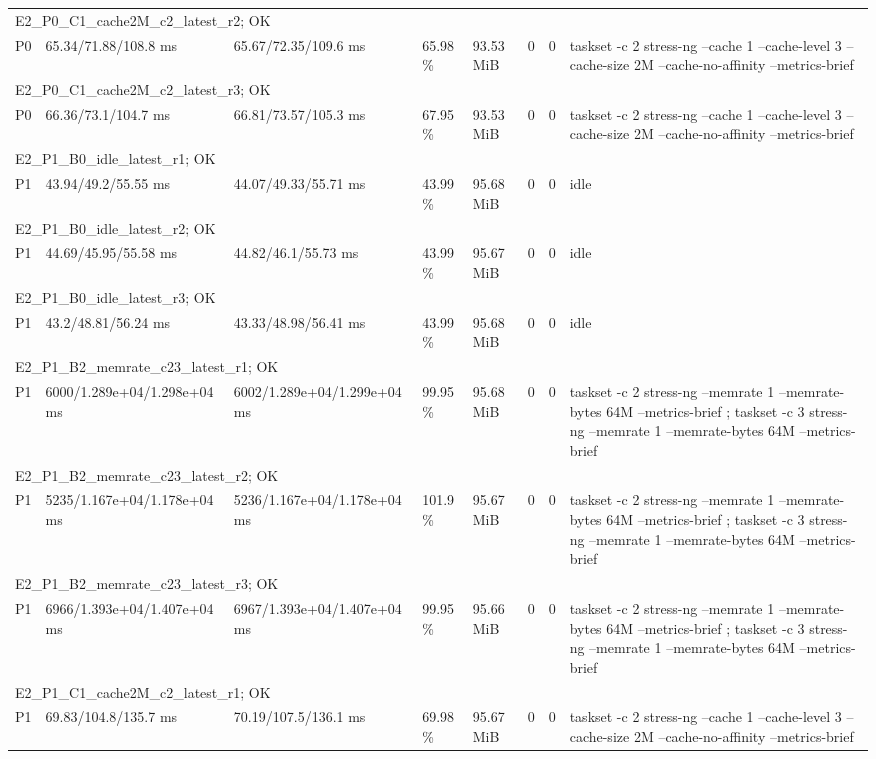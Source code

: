 \begin{tabular}{llllllll}
\multicolumn{8}{l}{E2\_P0\_C1\_cache2M\_c2\_latest\_r2; OK} \\
P0 & 65.34/71.88/108.8 ms & 65.67/72.35/109.6 ms & 65.98 \% & 93.53 MiB & 0 & 0 & taskset -c 2 stress-ng --cache 1 --cache-level 3 --cache-size 2M --cache-no-affinity --metrics-brief \\
\multicolumn{8}{l}{E2\_P0\_C1\_cache2M\_c2\_latest\_r3; OK} \\
P0 & 66.36/73.1/104.7 ms & 66.81/73.57/105.3 ms & 67.95 \% & 93.53 MiB & 0 & 0 & taskset -c 2 stress-ng --cache 1 --cache-level 3 --cache-size 2M --cache-no-affinity --metrics-brief \\
\multicolumn{8}{l}{E2\_P1\_B0\_idle\_latest\_r1; OK} \\
P1 & 43.94/49.2/55.55 ms & 44.07/49.33/55.71 ms & 43.99 \% & 95.68 MiB & 0 & 0 & idle \\
\multicolumn{8}{l}{E2\_P1\_B0\_idle\_latest\_r2; OK} \\
P1 & 44.69/45.95/55.58 ms & 44.82/46.1/55.73 ms & 43.99 \% & 95.67 MiB & 0 & 0 & idle \\
\multicolumn{8}{l}{E2\_P1\_B0\_idle\_latest\_r3; OK} \\
P1 & 43.2/48.81/56.24 ms & 43.33/48.98/56.41 ms & 43.99 \% & 95.68 MiB & 0 & 0 & idle \\
\multicolumn{8}{l}{E2\_P1\_B2\_memrate\_c23\_latest\_r1; OK} \\
P1 & 6000/1.289e+04/1.298e+04 ms & 6002/1.289e+04/1.299e+04 ms & 99.95 \% & 95.68 MiB & 0 & 0 & taskset -c 2 stress-ng --memrate 1 --memrate-bytes 64M --metrics-brief ; taskset -c 3 stress-ng --memrate 1 --memrate-bytes 64M --metrics-brief \\
\multicolumn{8}{l}{E2\_P1\_B2\_memrate\_c23\_latest\_r2; OK} \\
P1 & 5235/1.167e+04/1.178e+04 ms & 5236/1.167e+04/1.178e+04 ms & 101.9 \% & 95.67 MiB & 0 & 0 & taskset -c 2 stress-ng --memrate 1 --memrate-bytes 64M --metrics-brief ; taskset -c 3 stress-ng --memrate 1 --memrate-bytes 64M --metrics-brief \\
\multicolumn{8}{l}{E2\_P1\_B2\_memrate\_c23\_latest\_r3; OK} \\
P1 & 6966/1.393e+04/1.407e+04 ms & 6967/1.393e+04/1.407e+04 ms & 99.95 \% & 95.66 MiB & 0 & 0 & taskset -c 2 stress-ng --memrate 1 --memrate-bytes 64M --metrics-brief ; taskset -c 3 stress-ng --memrate 1 --memrate-bytes 64M --metrics-brief \\
\multicolumn{8}{l}{E2\_P1\_C1\_cache2M\_c2\_latest\_r1; OK} \\
P1 & 69.83/104.8/135.7 ms & 70.19/107.5/136.1 ms & 69.98 \% & 95.67 MiB & 0 & 0 & taskset -c 2 stress-ng --cache 1 --cache-level 3 --cache-size 2M --cache-no-affinity --metrics-brief \\

\end{tabular}
